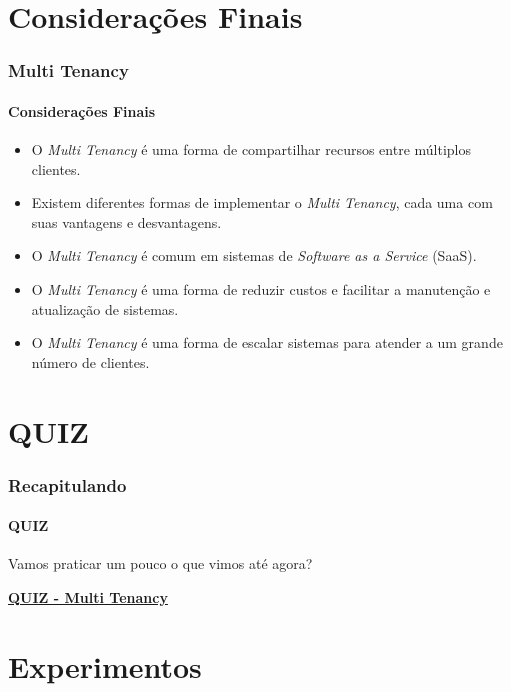 \documentclass[
	9pt, %
	t, %
]{beamer}
\begin{document}
\section{Considerações Finais}

\begin{frame}
	\frametitle{Multi Tenancy}
	\framesubtitle{Considerações Finais}

	\begin{itemize}
		\item O \textit{Multi Tenancy} é uma forma de compartilhar recursos entre múltiplos clientes.
		\item Existem diferentes formas de implementar o \textit{Multi Tenancy}, cada uma com suas vantagens e desvantagens.
		\item O \textit{Multi Tenancy} é comum em sistemas de \textit{Software as a Service} (SaaS).
		\item O \textit{Multi Tenancy} é uma forma de reduzir custos e facilitar a manutenção e atualização de sistemas.
		\item O \textit{Multi Tenancy} é uma forma de escalar sistemas para atender a um grande número de clientes.
	\end{itemize}

\end{frame}

\section{QUIZ}

\begin{frame}
	\frametitle{Recapitulando}
	\framesubtitle{QUIZ}

	Vamos praticar um pouco o que vimos até agora?
	\vfill

	\bigskip
	\centering

	\href{https://quizizz.com/admin/quiz/65c20cca036b2c1121fc8392?source=admin&trigger=quizPage}{\textbf{QUIZ - Multi Tenancy}}
	\vfill
		
\end{frame}


\section{Experimentos}
\end{document}
